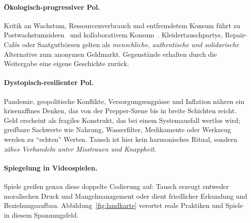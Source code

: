 \documentclass[11pt, a4paper]{article}
\begin{document}
\paragraph{Ökologisch-progressiver Pol.}
Kritik an Wachstum, Ressourcenverbrauch und entfremdetem Konsum führt zu
Postwachstumsideen~\cite{paech2012} und kollaborativem
Konsum~\cite{botsman2010}. Kleidertauschpartys, Repair-Cafés oder
Saatgutbörsen gelten als \emph{menschliche, authentische und solidarische}
Alternative zum anonymen Geldmarkt. Gegenstände erhalten durch die Weitergabe
eine eigene Geschichte zurück.

\paragraph{Dystopisch-resilienter Pol.}
Pandemie, geopolitische Konflikte, Versorgungsengpässe und Inflation nähren
ein krisenaffines Denken, das von der Prepper-Szene bis in breite Schichten
reicht. Geld erscheint als fragiles Konstrukt, das bei einem Systemausfall
wertlos wird; greifbare Sachwerte wie Nahrung, Wasserfilter, Medikamente oder
Werkzeug werden zu \enquote{echten} Werten. Tausch ist hier kein
harmonisches Ritual, sondern \emph{zähes Verhandeln unter Misstrauen und
Knappheit}.

\paragraph{Spiegelung in Videospielen.}
Spiele greifen genau diese doppelte Codierung auf: Tausch erzeugt entweder
moralischen Druck und Mangelmanagement oder dient friedlicher Erkundung und
Beziehungsaufbau. Abbildung~\ref{fig:landkarte} verortet reale Praktiken und
Spiele in diesem Spannungsfeld.
\end{document}
